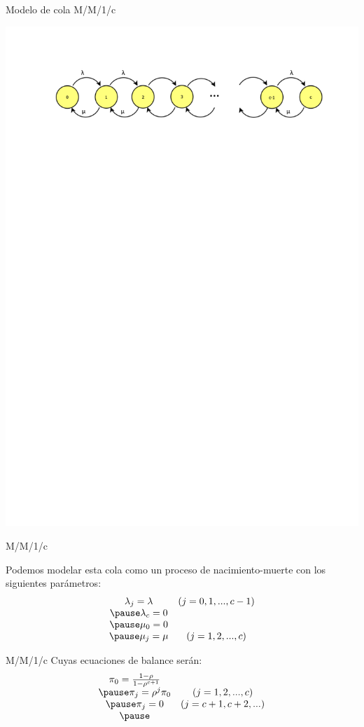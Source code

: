 \begin{frame}
	\centering \LARGE \color{naranjaUCA} Modelo de cola M/M/1/c
			\begin{center}
				\includegraphics[trim = 10mm 220mm 10mm 25mm, clip,width=0.9\linewidth]{MMc}
			\end{center}
\end{frame}
\begin{frame}{M/M/1/c}

	Podemos modelar esta cola como un proceso de nacimiento-muerte con los siguientes parámetros: \pause
		$$\begin{array}{cc}
		\lambda_j=\lambda & (j=0,1,...,c-1)\\ \pause
		\lambda_c=0 & \\ \pause
		\mu_0=0 &  \\ \pause
		\mu_j=\mu &  (j=1,2,...,c)\\
		\end{array}$$
\end{frame}
\begin{frame}{M/M/1/c}
	Cuyas ecuaciones de balance serán: \pause
		$$\begin{array}{cc}
		\pi_0=\frac{1-\rho}{1-\rho^{c+1}} & \\ \pause
		\pi_j=\rho^j\pi_0 & (j=1,2,...,c)\\ \pause
		\pi_j=0 & (j=c+1,c+2,...)\\ \pause
		\end{array}$$
\end{frame}
